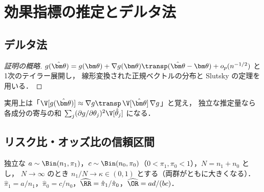 \section{効果指標の推定とデルタ法}\label{sec:04-delta}
\subsection{デルタ法}
\begin{proof}[証明の概略]
$g(\hat{\bm\theta})=g(\bm\theta)+\nabla g(\bm\theta)\transp(\hat{\bm\theta}-\bm\theta)+o_p(n^{-1/2})$ と1次のテイラー展開し，
線形変換された正規ベクトルの分布と Slutsky の定理を用いる．
\end{proof}
実用上は「$\V[g(\hat{\bm\theta})]\approx\nabla g\transp\,\V[\hat{\bm\theta}]\,\nabla g$」と覚え，
独立な推定量なら各成分の寄与の和 $\sum_j(\partial g/\partial\theta_j)^2\V[\hat\theta_j]$ になる．

\subsection{リスク比・オッズ比の信頼区間}\label{subsec:04-var}
\Hissu 独立な $a\sim\Bin(n_1,\pi_1)$，$c\sim\Bin(n_0,\pi_0)$（$0<\pi_1,\pi_0<1$），$N=n_1+n_0$ とし，
$N\to\infty$ のとき $n_1/N\to\kappa\in(0,1)$ とする（両群がともに大きくなる）．
$\hat\pi_1=a/n_1$，$\hat\pi_0=c/n_0$，$\widehat{\RR}=\hat\pi_1/\hat\pi_0$，$\widehat{\OR}=ad/(bc)$．

